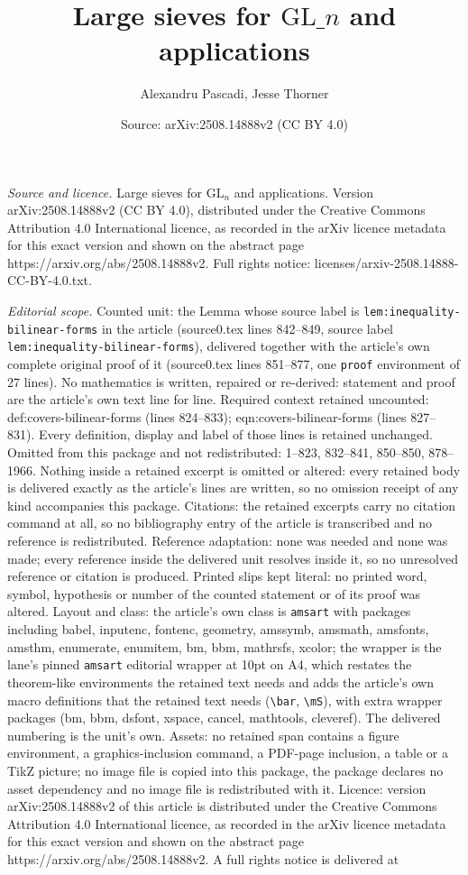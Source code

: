 \documentclass[10pt,a4paper]{amsart}
\title[Large sieves for $\mathrm{GL}\_n$ and applications]{Large sieves for $\mathrm{GL}\_n$ and applications}
\author{Alexandru Pascadi, Jesse Thorner}
\date{Source: arXiv:2508.14888v2 (CC BY 4.0)}
\begin{document}
\maketitle

\noindent\emph{Source and licence.} Large sieves for $\mathrm{GL}_n$ and applications. Version arXiv:2508.14888v2 (CC BY 4.0), distributed under the Creative Commons Attribution 4.0 International licence, as recorded in the arXiv licence metadata for this exact version and shown on the abstract page https://arxiv.org/abs/2508.14888v2. Full rights notice: licenses/arxiv-2508.14888-CC-BY-4.0.txt.\par\smallskip

\noindent\textit{Editorial scope.} Counted unit: the Lemma whose source label is \texttt{lem:inequality-bilinear-forms} in the article (source0.tex lines 842--849, source label \texttt{lem:inequality-bilinear-forms}), delivered together with the article's own complete original proof of it (source0.tex lines 851--877, one \texttt{proof} environment of 27 lines). No mathematics is written, repaired or re-derived: statement and proof are the article's own text line for line. Required context retained uncounted: def:covers-bilinear-forms (lines 824--833); eqn:covers-bilinear-forms (lines 827--831). Every definition, display and label of those lines is retained unchanged. Omitted from this package and not redistributed: 1--823, 832--841, 850--850, 878--1966. Nothing inside a retained excerpt is omitted or altered: every retained body is delivered exactly as the article's lines are written, so no omission receipt of any kind accompanies this package. Citations: the retained excerpts carry no citation command at all, so no bibliography entry of the article is transcribed and no reference is redistributed. Reference adaptation: none was needed and none was made; every reference inside the delivered unit resolves inside it, so no unresolved reference or citation is produced. Printed slips kept literal: no printed word, symbol, hypothesis or number of the counted statement or of its proof was altered. Layout and class: the article's own class is \texttt{amsart} with packages including babel, inputenc, fontenc, geometry, amssymb, amsmath, amsfonts, amsthm, enumerate, enumitem, bm, bbm, mathrsfs, xcolor; the wrapper is the lane's pinned \texttt{amsart} editorial wrapper at 10pt on A4, which restates the theorem-like environments the retained text needs and adds the article's own macro definitions that the retained text needs (\texttt{\textbackslash bar}, \texttt{\textbackslash mS}), with extra wrapper packages (bm, bbm, dsfont, xspace, cancel, mathtools, cleveref). The delivered numbering is the unit's own. Assets: no retained span contains a figure environment, a graphics-inclusion command, a PDF-page inclusion, a table or a TikZ picture; no image file is copied into this package, the package declares no asset dependency and no image file is redistributed with it. Licence: version arXiv:2508.14888v2 of this article is distributed under the Creative Commons Attribution 4.0 International licence, as recorded in the arXiv licence metadata for this exact version and shown on the abstract page https://arxiv.org/abs/2508.14888v2. A full rights notice is delivered at 
\end{document}
